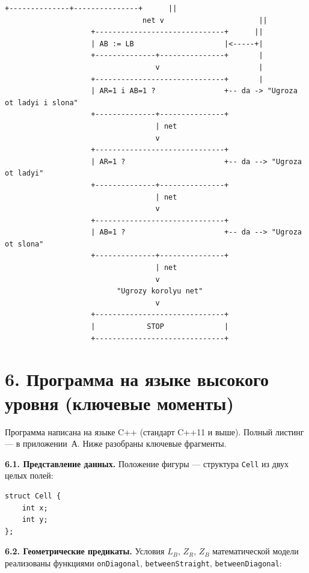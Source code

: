 \documentclass[12pt,a4paper]{article}
\begin{document}
\begin{Verbatim}[frame=single]
                    +--------------+---------------+      ||
                                net v                      ||
                    +------------------------------+      ||
                    | AB := LB                     |<-----+|
                    +--------------+---------------+       |
                                   v                       |
                    +------------------------------+       |
                    | AR=1 i AB=1 ?                +-- da -> "Ugroza ot ladyi i slona"
                    +--------------+---------------+
                                   | net
                                   v
                    +------------------------------+
                    | AR=1 ?                       +-- da --> "Ugroza ot ladyi"
                    +--------------+---------------+
                                   | net
                                   v
                    +------------------------------+
                    | AB=1 ?                       +-- da --> "Ugroza ot slona"
                    +--------------+---------------+
                                   | net
                                   v
                          "Ugrozy korolyu net"
                                   v
                    +------------------------------+
                    |            STOP              |
                    +------------------------------+
\end{Verbatim}

\section*{6. Программа на языке высокого уровня (ключевые моменты)}

Программа написана на языке C++ (стандарт C++11 и выше). Полный
листинг --- в приложении~А. Ниже разобраны ключевые фрагменты.

\textbf{6.1. Представление данных.} Положение фигуры --- структура
\texttt{Cell} из двух целых полей:

\begin{Verbatim}
struct Cell {
    int x;
    int y;
};
\end{Verbatim}

\textbf{6.2. Геометрические предикаты.} Условия $L_B$, $Z_R$, $Z_B$
математической модели реализованы функциями \texttt{onDiagonal},
\texttt{betweenStraight}, \texttt{betweenDiagonal}:
\end{document}
